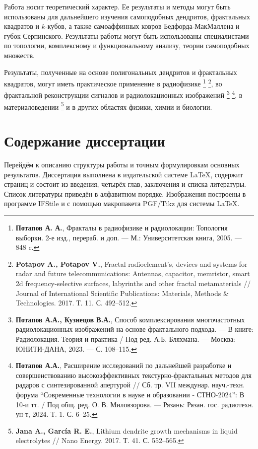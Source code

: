 \documentclass[a5paper,9pt,twoside]{extarticle} %
\begin{document}
Работа носит теоретический характер. 
Ее результаты и методы могут быть использованы для дальнейшего изучения самоподобных дендритов, фрактальных квадратов и $k$-кубов, а также самоаффинных ковров Бедфорда-МакМаллена и губок Серпинского. 
Результаты работы могут быть использованы специалистами по топологии, комплексному и функциональному анализу, теории самоподобных множеств.

Результаты, полученные на основе полигональных дендритов и фрактальных квадратов, могут иметь практическое применение в радиофизике \footnote{{\bf Потапов А. А.}, Фракталы в радиофизике и радиолокации: Топология выборки. 2-е изд., перераб. и доп. --- М.: Университетская книга, 2005. --- 848 c.} \footnote{{\bf Potapov A., Potapov V.}, Fractal radioelement’s, devices and systems for radar and future telecommunications: Antennas, capacitor, memristor, smart 2d frequency-selective surfaces, labyrinths and other fractal metamaterials // Journal of International Scientific Publications: Materials, Methods \& Technologies. 2017. Т. 11. С. 492--512.}, во фрактальной реконструкции сигналов и радиолокационных изображений \footnote{{\bf Потапов А.А., Кузнецов В.А.}, Способ комплексирования многочастотных радиолокационных изображений на основе фрактального подхода. --- В книге: Радиолокация. Теория и практика / Под ред. А.Б. Бляхмана. --- Москва: ЮНИТИ-ДАНА, 2023. --- С. 108--115. } \footnote{{\bf Потапов А.А.}, 
Расширение исследований по дальнейшей разработке и совершенствованию высокоэффективных текстурно-фрактальных методов для радаров с синтезированной апертурой // 
Сб. тр. VII междунар. науч.-техн. форума “Современные технологии в науке и образовании - СТНО-2024”: В 10-и тт. / Под общ. ред. О. В. Миловзорова. --- Рязань: Рязан. гос. радиотехн. ун-т, 2024. Т. 1. С. 6--25.}, в материаловедении \footnote{{\bf Jana A., García R. E.}, Lithium dendrite growth mechanisms in liquid electrolytes // Nano Energy. 2017. Т. 41. С. 552--565.} и в других областях физики, химии и биологии.

\section{Содержание диссертации}

Перейдём к описанию структуры работы и точным формулировкам основных результатов.
Диссертация выполнена в издательской системе \LaTeX, содержит \red{\pageref{LastPage}} страниц и состоит из введения, четырёх глав, заключения и списка литературы.
Список литературы приведён в алфавитном порядке.
Изображения построены в программе IFStile и с помощью макропакета PGF/Tikz для системы \LaTeX.\\
\end{document}
